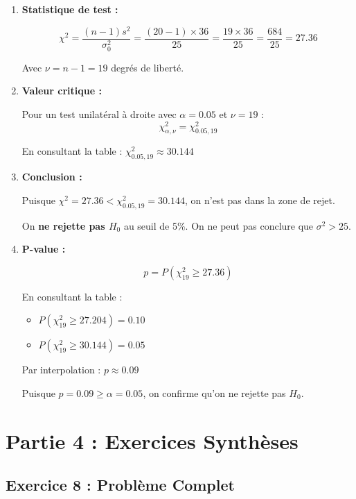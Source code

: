 \documentclass[11pt,a4paper]{article}
\begin{document}
\begin{enumerate}
    \item \textbf{Statistique de test :}
    
    $$\chi^2 = \frac{(n-1)s^2}{\sigma_0^2} = \frac{(20-1) \times 36}{25} = \frac{19 \times 36}{25} = \frac{684}{25} = 27.36$$
    
    Avec $\nu = n - 1 = 19$ degrés de liberté.
    
    \item \textbf{Valeur critique :}
    
    Pour un test unilatéral à droite avec $\alpha = 0.05$ et $\nu = 19$ :
    $$\chi^2_{\alpha, \nu} = \chi^2_{0.05, 19}$$
    
    En consultant la table : $\chi^2_{0.05, 19} \approx 30.144$
    
    \item \textbf{Conclusion :}
    
    Puisque $\chi^2 = 27.36 < \chi^2_{0.05, 19} = 30.144$, on n'est pas dans la zone de rejet.
    
    On \textbf{ne rejette pas $H_0$} au seuil de 5\%. On ne peut pas conclure que $\sigma^2 > 25$.
    
    \item \textbf{P-value :}
    
    $$p = P(\chi^2_{19} \geq 27.36)$$
    
    En consultant la table :
    \begin{itemize}
        \item $P(\chi^2_{19} \geq 27.204) = 0.10$
        \item $P(\chi^2_{19} \geq 30.144) = 0.05$
    \end{itemize}
    
    Par interpolation : $p \approx 0.09$
    
    Puisque $p = 0.09 \geq \alpha = 0.05$, on confirme qu'on ne rejette pas $H_0$.
\end{enumerate}

\newpage

\section{Partie 4 : Exercices Synthèses}

\subsection{Exercice 8 : Problème Complet}
\end{document}
